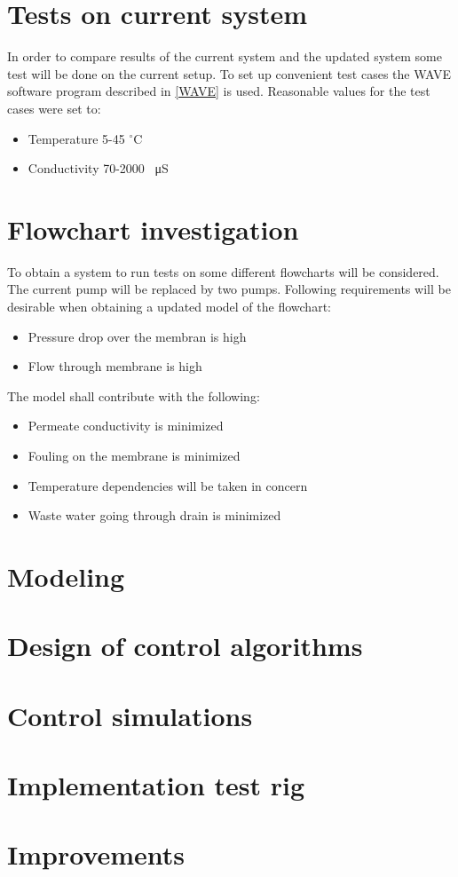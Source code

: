 
\section{Tests on current system}
In order to compare results of the current system and the updated system some test will be done on the current setup. To set up convenient test cases the WAVE software program described in \ref{WAVE} is used. Reasonable values for the test cases were set to:
\begin{itemize}
\renewcommand\labelitemi{ }
\item Temperature 5-45 $^\circ$C
\item Conductivity 70-2000 \SI{}{\micro\siemens}
\end{itemize}

\section{Flowchart investigation}
To obtain a system to run tests on some different flowcharts will be considered. The current pump will be replaced by two pumps. Following requirements will be desirable when obtaining a updated model of the flowchart:
\begin{itemize}
\renewcommand\labelitemi{-}
\item Pressure drop over the membran is high
\item Flow through membrane is high
\end{itemize}
The model shall contribute with the following:
\begin{itemize}
\renewcommand\labelitemi{-}
\item Permeate conductivity is minimized
\item Fouling on the membrane is minimized
\item Temperature dependencies will be taken in concern
\item Waste water going through drain is minimized
\end{itemize}




\section{Modeling}


\section{Design of control algorithms}

\section{Control simulations}

\section{Implementation test rig}

\section{Improvements}

